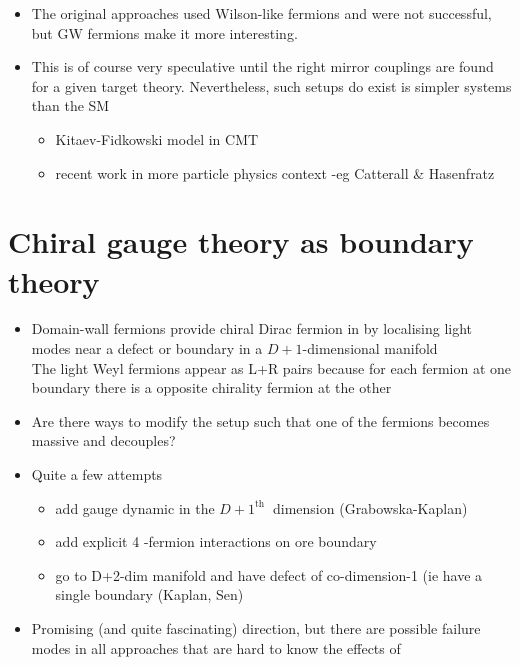 \begin{itemize}
Eg: the $\eta\eta\rho$ may from a composite Weyl fermion and then combing with the \(\xi\) through \(\lambda_{2}\) would generate a mass term which quantum correction would generically push to the UV cutoff and remove these states from the low every spectrum

\item The original approaches used Wilson-like fermions and were not successful, but GW fermions make it more interesting.
  \item This is of course very speculative until the right mirror couplings are found for a given target theory. Nevertheless, such setups do exist is simpler systems than the SM
  \begin{itemize} 
  \item Kitaev-Fidkowski model in CMT
  \item recent work in more particle physics context -eg Catterall \& Hasenfratz
  \end{itemize}
\end{itemize}

\section{Chiral gauge theory as boundary theory}
\begin{itemize}
  \item Domain-wall fermions provide chiral Dirac fermion in by localising light modes near a defect or boundary in a \(D+1\)-dimensional manifold\\
The light Weyl fermions appear as L+R pairs because for each fermion at one boundary there is a opposite chirality fermion at the other
  \item Are there ways to modify the setup such that one of the fermions becomes massive and decouples?
  \item Quite a few attempts
  \begin{itemize}
  \item add gauge dynamic in the \(D+1^{\text {th }}\) dimension (Grabowska-Kaplan)
  \item add explicit 4 -fermion interactions on ore boundary
  \item go to D+2-dim manifold and have defect of co-dimension-1 (ie have a single boundary (Kaplan, Sen)
  \end{itemize}
  \item Promising (and quite fascinating) direction, but there are possible failure modes in all approaches that are hard to know the effects of
\end{itemize}

